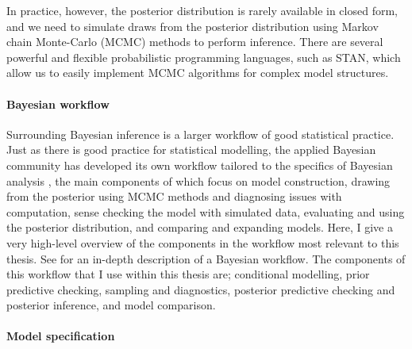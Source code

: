 In practice, however, the posterior distribution is rarely available in closed form, and we need to simulate draws from the posterior distribution using Markov chain Monte-Carlo (MCMC) methods to perform inference. There are several powerful and flexible probabilistic programming languages, such as STAN, which allow us to easily implement MCMC algorithms for complex model structures.

\paragraph*{Bayesian workflow}

Surrounding Bayesian inference is a larger workflow of good statistical practice. Just as there is good practice for statistical modelling, the applied Bayesian community has developed its own workflow tailored to the specifics of Bayesian analysis \citep{gelman_workflow_2020}, the main components of which focus on model construction, drawing from the posterior using MCMC methods and diagnosing issues with computation, sense checking the model with simulated data, evaluating and using the posterior distribution, and comparing and expanding models. Here, I give a very high-level overview of the components in the workflow most relevant to this thesis. See \citep{gelman_workflow_2020} for an in-depth description of a Bayesian workflow. The components of this workflow that I use within this thesis are; conditional modelling, prior predictive checking, sampling and diagnostics, posterior predictive checking and posterior inference, and model comparison.

\paragraph*{Model specification}

